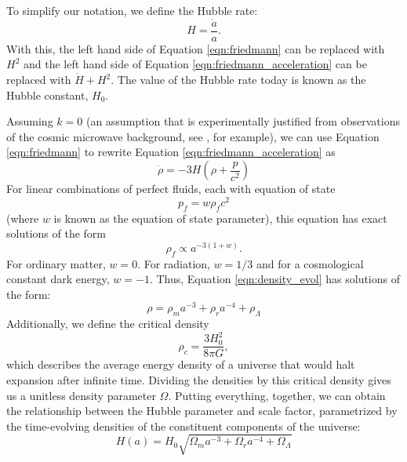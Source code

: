 To simplify our notation, we define the Hubble rate:
$$H=\frac{\dot{a}}{a}.$$
With this, the left hand side of Equation \ref{eqn:friedmann} can be replaced with $H^2$ and the left hand side of Equation \ref{eqn:friedmann_acceleration} can be replaced with $\dot{H} + H^2$.  The value of the Hubble rate today is known as the Hubble constant, $H_0$.

Assuming $k=0$ (an assumption that is experimentally justified from observations of the cosmic microwave background, see \citet{planck_collaboration_planck_2016}, for example), we can use Equation \ref{eqn:friedmann} to rewrite Equation \ref{eqn:friedmann_acceleration} as
\begin{equation}
    \dot{\rho} = -3H\left(\rho + \frac{p}{c^2}\right)
    \label{eqn:density_evol}
\end{equation}
For linear combinations of perfect fluids, each with equation of state
$$p_f = w\rho_f c^2$$
(where $w$ is known as the equation of state parameter), this equation has exact solutions of the form
$$\rho_f \propto a^{-3(1+w)}.$$
For ordinary matter, $w=0$. For radiation, $w=1/3$ and for a cosmological constant dark energy, $w=-1$. Thus, Equation \ref{eqn:density_evol} has solutions of the form:
$$\rho = \rho_m a^{-3} + \rho_r a^{-4} + \rho_\Lambda$$
Additionally, we define the critical density
$$\rho_{c} = \frac{3H_0^2}{8\pi G},$$
which describes the average energy density of a universe that would halt expansion after infinite time. Dividing the densities by this critical density gives us a unitless density parameter $\Omega$. Putting everything, together, we can obtain the relationship between the Hubble parameter and scale factor, parametrized by the time-evolving densities of the constituent components of the universe:
\begin{equation}
    H(a) = H_0\sqrt{\Omega_m a^{-3} + \Omega_r a^{-4} + \Omega_\Lambda}
    \label{eqn:hubble_vs_a}
\end{equation}

